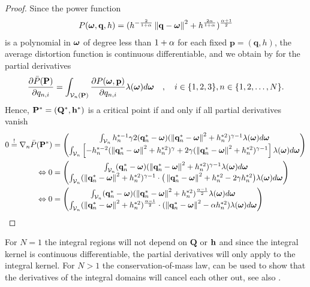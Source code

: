 \documentclass[smallabstract,smallcaptions]{dccpaper}
\newif\ifarxiv\arxivfalse
\newenvironment{remark}{\par\vspace{1.5ex}\noindent{\em Remark\/}.}{\par\vspace{1.5ex}}
\renewcommand{\vq}{\mathbf p}
\renewcommand{\vp}{\mathbf q}
\renewcommand{\vQ}{\mathbf P}
\renewcommand{\vP}{\mathbf Q}
\newcommand{\df}{\ensuremath{\lam}}         %
\newcommand{\Pbar}{\ensuremath{\bar{P}}}         %
\newcommand{\Vor}{\ensuremath{\mathcal{V}}}         %
\begin{document}
\begin{proof}
Since the power function 
%
\begin{align}
  P(\vome,\vp,h)= (h^{-\frac{2}{1+\alp}}\Norm{\vp-\vome}^2 + h^{\frac{2\alp}{1+\alp}})^{\frac{\alp+1}{2}}
\end{align}  
%
is a polynomial in $\boldsymbol{ \omega}$ of degree less than $1+\alpha$ for each fixed $\vq=(\vp,h)$, the average distortion function is continuous
differentiable, and we obtain by \cite[Thm.1]{WJ18} for the partial derivatives 
%
\begin{align}
  \frac{\partial \Pbar(\vQ)}{\partial q_{n,i}} = \int_{\Vor_n(\vQ)} \frac{\partial P(\vome,\vq)}{\partial q_{n,i}}
  \df(\vome)d\vome\quad,\quad i\in\{1,2,3\},n\in\{1,2,\dots,N\}.
\end{align}
%
Hence, $\vQ^*=(\vP^*,\vh^*)$ is a critical point if and only if all partial derivatives vanish 
%
\begin{align}
 0\overset{!}{=} \nabla_n \Pbar(\vQ^*) &= \begin{pmatrix} 
   \int_{\Vor_n} h_n^{*-1} \gam 2 (\vp^*_{n}-\vome)  (\Norm{\vp_n^*-\vome}^2 +h_n^{*2})^{\gam-1}  \df(\vome)d \vome\\
   \int_{\Vor_n} \left[-h_n^{*-2}(\Norm{\vp^*_n-\vome}^2 + h_n^{*2})^{\gam} + 2\gam (\Norm{\vp_n^*-\vome}^2 +h_n^{*2})^{\gam-1}\right]
    \df(\vome)d \vome
  \end{pmatrix} \notag\\
\LRA 0&= \begin{pmatrix}
  \int_{\Vor_n} (\vp^*_{n}-\vome) (\Norm{\vp^*_n-\vome}^2 +h_n^{*2})^{\gam-1} \df(\vome)d \vome\\
  \int_{\Vor_n} (\Norm{\vp^*_n-\vome}^2 +h_n^{*2})^{\gam-1}\cdot \big(\Norm{\vp^*_n-\vome}^2+h_n^{*2} - 2\gam h_n^{*2} \big)
  \df(\vome)d \vome
 \end{pmatrix}\notag\\
 \LRA 0&= \begin{pmatrix}
   \int_{\Vor_n} (\vp_{n}^*-\vome) (\Norm{\vp^*_n-\vome}^2 +h_n^{*2})^{\frac{\alp-1}{2}} \df(\vome)d \vome\\
   \int_{\Vor_n} (\Norm{\vp_n^*-\vome}^2 +h_n^{*2})^{\frac{\alp-1}{2}}\cdot (\Norm{\vp_n^*-\vome}^2 - \alp h_n^{*2} )
   \df(\vome)d \vome
  \end{pmatrix}\label{eq:graddph}
\end{align}
%
\end{proof}
%
\fi
For $N=1$ the integral regions will not depend on $\vP$ or ${\mathbf h}$ and since the integral kernel is continuous differentiable, the
partial derivatives will only apply to the integral kernel. For $N>1$ the conservation-of-mass law, can be used to show
that the derivatives of the integral domains will cancel each other out, see also \cite{CMB05}. 
%
\ifarxiv
\begin{remark}
  The shape of the regions depend on the parameters, which if different for each quantization point (heterogeneous),
  generate spherical and not polyhedral regions. We will show later, that homogeneous parameter selection with polyhedral
  regions will be the optimal regions for $d=1$. 
\end{remark}
\fi
\end{document}
